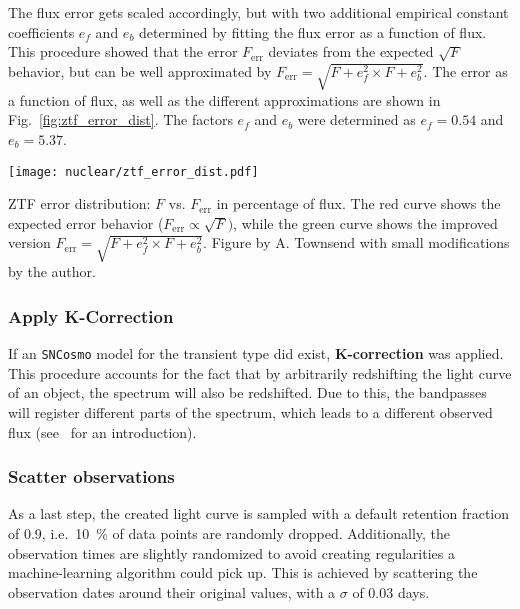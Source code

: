 The flux error gets scaled accordingly, but with two additional empirical constant coefficients $e_f$ and $e_b$ determined by fitting the flux error as a function of flux. This procedure showed that the error $F_\text{err}$ deviates from the expected $\sqrt{F}$ behavior, but can be well approximated by $F_\text{err} = \sqrt{F + e_f^2\times F + e_b^2}$. The error as a function of flux, as well as the different approximations are shown in Fig.~\ref{fig:ztf_error_dist}. The factors $e_f$ and $e_b$ were determined as $e_f = 0.54$ and $e_b = 5.37$.

\begin{marginfigure}
    \texttt{[image: nuclear/ztf\_error\_dist.pdf]}
    \caption[ZTF error distribution]{ZTF error distribution: $F$ vs. $F_\text{err}$ in percentage of flux. The red curve shows the expected error behavior ($F_\text{err}\propto \sqrt{F})$, while the green curve shows the improved version $F_\text{err} = \sqrt{F + e_f^2\times F + e_b^2}$. Figure by A. Townsend with small modifications by the author.}
\end{marginfigure}

\subsubsection{Apply K-Correction}
If an \texttt{SNCosmo} model for the transient type did exist, \textbf{K-correction} was applied. This procedure accounts for the fact that by arbitrarily redshifting the light curve of an object, the spectrum will also be redshifted. Due to this, the bandpasses will register different parts of the spectrum, which leads to a different observed flux (see~ for an introduction).

\subsubsection{Scatter observations}
As a last step, the created light curve is sampled with a default retention fraction of 0.9, i.e.~\SI{10}{\percent} of data points are randomly dropped. Additionally, the observation times are slightly randomized to avoid creating regularities a machine-learning algorithm could pick up. This is achieved by scattering the observation dates around their original values, with a $\sigma$ of $0.03$ days.

